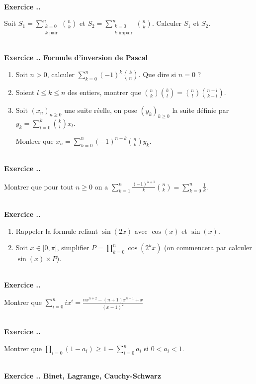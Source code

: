 \documentclass{article}
\newcounter{exo}
\newcommand{\exercice}[1][\null]{\textbf{\\ \large Exercice \thesection.\theexo. \normalsize #1} \addtocounter{exo}{1}}
\begin{document}
\exercice

Soit $\displaystyle S_1 = \sum_{\substack{k=0 \\ k \text{ pair}}}^n {n \choose k}$ et $\displaystyle S_2 = \sum_{\substack{k=0 \\ k \text{ impair}}}^n {n \choose k}$. Calculer $S_1$ et $S_2$.

\exercice[Formule d'inversion de Pascal]

\begin{enumerate}

\item Soit $n > 0$, calculer $\displaystyle \sum_{k=0}^n (-1)^k {k \choose n}$. Que dire si $n = 0$ ?

\item Soient $l \le k \le n$ des entiers, montrer que $\displaystyle {n \choose k} {k \choose l} = {n \choose l} {n-l \choose k-l} $.

\item Soit $(x_n)_{n \ge 0}$ une suite réelle, on pose $(y_k)_{k \ge 0}$ la suite définie par $\displaystyle y_k = \sum_{l=0}^k {k \choose l} x_l$.

Montrer que $\displaystyle x_n = \sum_{k=0}^n (-1)^{n-k} {n \choose k} y_k$.

\end{enumerate}


\exercice

Montrer que pour tout $n \ge 0$ on a $\displaystyle \sum_{k=1}^n \frac{(-1)^{k+1}}{k} {n \choose k} = \sum_{k=0}^n \frac{1}{k}$.


\exercice

\begin{enumerate}

\item Rappeler la formule reliant $\sin(2x)$ avec $\cos(x)$ et $\sin(x)$.

\item Soit $x \in ]0, \pi [$, simplifier $P =\displaystyle \prod_{k=0}^n \cos(2^k x)$ (on commencera par calculer $ \sin (x) \times P$).

\end{enumerate}


\exercice

Montrer que $\displaystyle \sum_{i=0}^n i x^i = \frac{n x^{n+2} - (n+1)x^{n+1} +x}{(x-1)^2}$

\exercice

Montrer que $\displaystyle \prod_{i=0}(1-a_i) \ge 1- \sum_{i=0}^n a_i$ si $0<a_i<1$.

\exercice[Binet, Lagrange, Cauchy-Schwarz]
\end{document}
